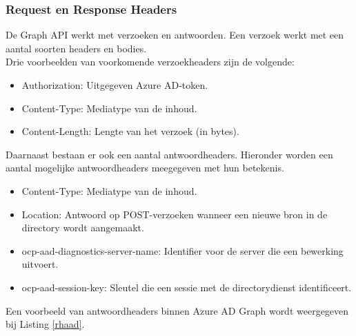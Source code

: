 \subsubsection{Request en Response Headers}


De Graph \ac{API} werkt met verzoeken en antwoorden. Een verzoek werkt met een aantal soorten headers en bodies. \\

Drie voorbeelden van voorkomende verzoekheaders zijn de volgende:

\begin{itemize}
    \item Authorization: Uitgegeven Azure \ac{AD}-token.
    \item Content-Type: Mediatype van de inhoud.
    \item Content-Length: Lengte van het verzoek (in bytes).
\end{itemize} 

Daarnaast bestaan er ook een aantal antwoordheaders. Hieronder worden een aantal mogelijke antwoordheaders meegegeven met hun betekenis.

\begin{itemize}
    \item Content-Type: Mediatype van de inhoud.
    \item Location: Antwoord op POST-verzoeken wanneer een nieuwe bron in de directory wordt aangemaakt.
    \item ocp-aad-diagnostics-server-name: Identifier voor de server die een bewerking uitvoert.
    \item ocp-aad-session-key: Sleutel die een sessie met de directorydienst identificeert.
\end{itemize}

Een voorbeeld van antwoordheaders binnen Azure \ac{AD} Graph wordt weergegeven bij Listing \ref{rhaad}. \\


